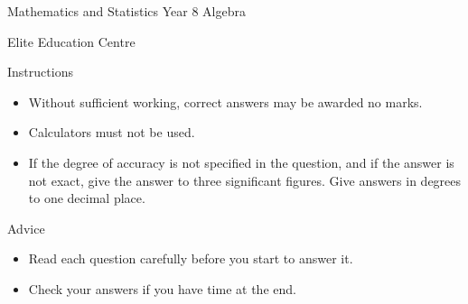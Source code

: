 \begin{bxExamHeader}
    \begin{center}\Huge{Mathematics and Statistics Year 8 Algebra} \end{center}
	\null\hfill Elite Education Centre

    \vspace*{2\baselineskip}

    Instructions 
    \begin{itemize}
        \item Without sufficient working, correct answers may be awarded no marks.
		\item Calculators must not be used.
        \item If the degree of accuracy is not specified in the question, and if the answer is not exact, give the answer to
three significant figures. Give answers in degrees to one decimal place.
    \end{itemize}
	
    \vspace*{2\baselineskip}
	
	Advice
	\begin{itemize}
	    \item Read each question carefully before you start to answer it.
        \item Check your answers if you have time at the end.
	\end{itemize}

    \vspace*{\baselineskip}
	
\end{bxExamHeader}



